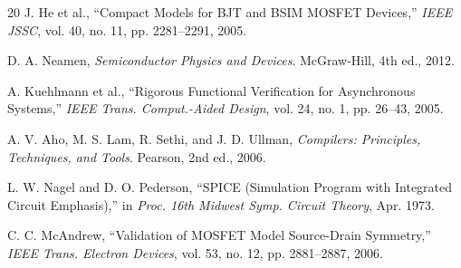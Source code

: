 \documentclass[conference]{IEEEtran}
\begin{document}
\begin{thebibliography}{20}
J. He et al., ``Compact Models for BJT and BSIM MOSFET Devices,''
\textit{IEEE JSSC}, vol. 40, no. 11, pp. 2281--2291, 2005.

D. A. Neamen, \textit{Semiconductor Physics and Devices}. 
McGraw-Hill, 4th ed., 2012.

A. Kuehlmann et al., ``Rigorous Functional Verification for Asynchronous Systems,''
\textit{IEEE Trans. Comput.-Aided Design}, vol. 24, no. 1, pp. 26--43, 2005.

A. V. Aho, M. S. Lam, R. Sethi, and J. D. Ullman, \textit{Compilers: Principles, Techniques, and Tools}.
Pearson, 2nd ed., 2006.

L. W. Nagel and D. O. Pederson, ``SPICE (Simulation Program with Integrated Circuit Emphasis),''
in \textit{Proc. 16th Midwest Symp. Circuit Theory}, Apr. 1973.

C. C. McAndrew, ``Validation of MOSFET Model Source-Drain Symmetry,''
\textit{IEEE Trans. Electron Devices}, vol. 53, no. 12, pp. 2881--2887, 2006.

\end{thebibliography}
\end{document}

